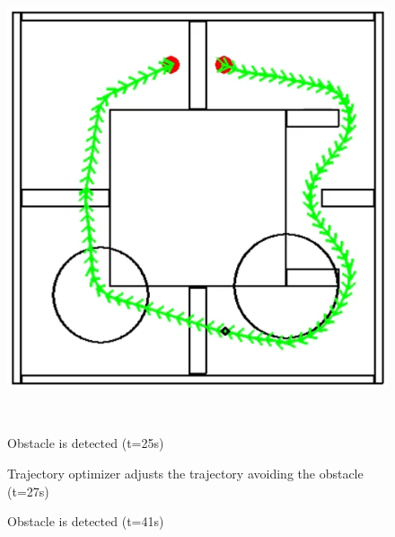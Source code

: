\begin{figure}[!htb]
\begin{minipage}[b]{.3\linewidth}
        \centering
        \includegraphics[width=0.8\linewidth]{Figures/07_simulation/basic/07basic.png}
    \end{minipage}\\[-7pt]
    \begin{minipage}[t]{.3\linewidth}
        \caption{Obstacle is detected (t=25s) }
        \label{fig:basic04}
    \end{minipage}%
    \hfill%
    \begin{minipage}[t]{.3\linewidth}
        \caption{Trajectory optimizer adjusts the trajectory avoiding the obstacle (t=27s)}
        \label{fig:basic05}
    \end{minipage}%
    \hfill%
    \begin{minipage}[t]{.3\linewidth}
        \caption{Obstacle is detected  (t=41s)}
        \label{fig:basic07}
    \end{minipage}%
\end{figure}

